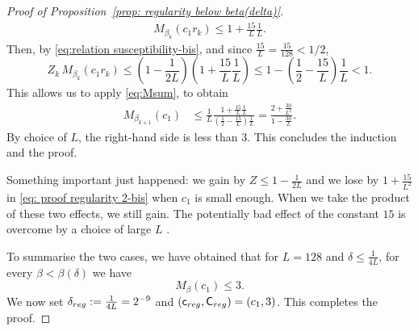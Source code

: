 \documentclass[10pt,a4paper]{amsart}
\newcommand\Creg{\mathsf{C}_{\textup{reg}}}
\newcommand\creg{\mathsf{c}_{\textup{reg}}}
\newcommand{\deltareg}{\delta_{\textup{reg}}}
\begin{document}
\begin{proof}[Proof of Proposition~\textup{\ref{prop: regularity below beta(delta)}}]
\begin{align}\label{eq:regM}
M_{\beta_k}(c_1r_k)
\le 1+  \frac{15}{L} \frac{1}{L}.
\end{align}
Then, by \eqref{eq:relation susceptibility-bis}, and since $\tfrac{15}{L}=\tfrac{15}{128}<1/2$,
\begin{equation}
\label{eq:ZMbd}
    Z_{k}\, M_{\beta_k}(c_1r_k)
    \le
    \left(1-\frac{1}{2L} \right) \left(1 + \frac{15}{L} \frac{1}{L} \right)
    \le
    1 - \left( \frac 12 - \frac{15}{L}\right) \frac 1L
    <1
    .
\end{equation}
This allows us to apply \eqref{eq:Msum}, to obtain
\begin{align}
    M_{\beta_{k+1}}(c_1)
	&
    \le
    \frac 1L \frac{1 + \frac{15}{L} \frac{1}{L}}{( \frac 12 - \frac{15}{L}) \frac 1L}
    =
    \frac{2 + \frac{30}{L^2}}{1 - \frac{30}{L}}
	.
\end{align}
By choice of $L$, the right-hand side is less than
$3$.
This concludes the induction and the proof.

Something important just happened:
we gain by $Z \le 1 -\frac{1}{2L}$ and we lose by $1+\frac{15}{L^2}$ in \eqref{eq: proof regularity 2-bis}
when $c_1$ is small
enough.
When we take the product of these two effects, we still gain.
The potentially bad effect of the constant $15$ is overcome by a choice of large $L$ .



To summarise the two cases, we have obtained that for $L=128$ and $\delta\leq \tfrac{1}{4L}$,  for every $\beta< \beta(\delta)$ we have
\begin{equation}
    M_\beta(c_1)
    \leq 3.
\end{equation}
We now set $\deltareg:=\frac{1}{4L} = 2^{-9}$ and $(\creg,\Creg)=(c_1,3)$.
This completes the proof.
\end{proof}
\end{document}
